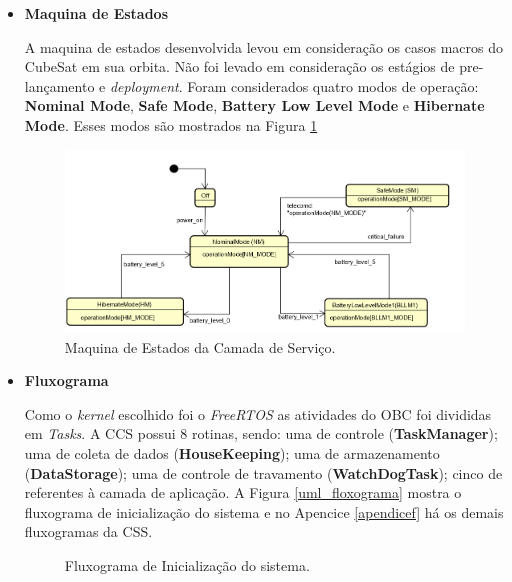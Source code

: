 \begin{itemize}

\item \textbf{Maquina de Estados}

A maquina de estados desenvolvida levou em consideração os casos macros do CubeSat em sua orbita. Não foi levado em consideração os estágios de pre-lançamento e \textit{deployment}. Foram considerados quatro modos de operação: \textbf{Nominal Mode}, \textbf{Safe Mode}, \textbf{Battery Low Level Mode} e \textbf{Hibernate Mode}. Esses modos são mostrados na Figura \ref{uml_me}

\begin{figure}[h]
	\centering
	\caption{Maquina de Estados da Camada de Serviço.}
	
	\includegraphics[keepaspectratio=true,scale=0.62]{figuras/stateMachine.png}
	
	\label{uml_me}
\end{figure}

\item \textbf{Fluxograma}

Como o \textit{kernel} escolhido foi o \textit{FreeRTOS} as atividades do OBC foi divididas em \textit{Tasks}. A CCS possui 8 rotinas, sendo: uma de controle (\textbf{TaskManager}); uma de coleta de dados (\textbf{HouseKeeping}); uma de armazenamento (\textbf{DataStorage}); uma de controle de travamento (\textbf{WatchDogTask}); cinco de referentes à camada de aplicação. A Figura \ref{uml_floxograma} mostra o fluxograma de inicialização do sistema e no Apencice \ref{apendicef} há os demais fluxogramas da CSS. 

\begin{figure}[h]
	\centering
	\caption{Fluxograma de Inicialização do sistema.}
	

\end{figure}
\end{itemize}
